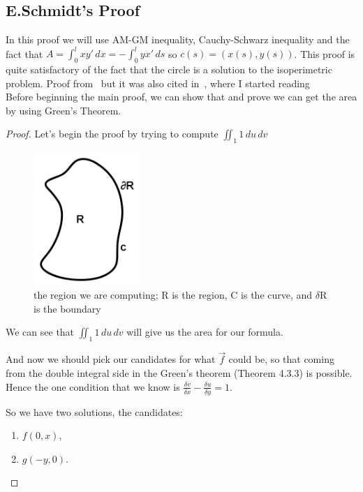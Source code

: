 \documentclass[a4paper]{book}
\numberwithin{theorem}{section}%
\begin{document}
\subsection{E.Schmidt's Proof}
In this proof we will use AM-GM inequality, Cauchy-Schwarz inequality and the fact that $\displaystyle A=\int_{0}^{l} xy' \,dx = -\int_{0}^{l} yx' \,ds$ so $\displaystyle c(s)=(x(s),y(s))$. This proof is quite satisfactory of the fact that the circle is a solution to the isoperimetric problem. Proof from~\citep{do2016differential} but it was also cited in~\citep{gluck2012isoperimetric}, where I started reading~\citep{do2016differential}
\leavevmode \\

Before beginning the main proof, we can show that and prove we can get the area by using Green's Theorem.
\newpage
\begin{proof}
	Let's begin the proof by trying to compute $\displaystyle \iint_{1} 1 \,du\,dv$
	\begin{figure}[hbt!]
        \begin{center}   
            \includegraphics[width=40mm]{Schmidt3}
            \caption{the region we are computing; R is the region, C is the curve, and $\delta\mathrm{R}$ is the boundary}
        \end{center}
    \end{figure}\leavevmode
    \newline
    We can see that $\displaystyle \iint_{1} 1 \,du\,dv$ will give us the area for our formula.

	And now we should pick our candidates for what $\overrightarrow{f}$ could be, so that coming from the double integral side in the Green's theorem (Theorem 4.3.3) is possible. Hence the one condition that we know is $\displaystyle \frac{\delta v}{\delta x}-\frac{\delta u}{\delta y}=1$.
	
	So we have two solutions, the candidates:
	\begin{enumerate}
		\item $f(0,x)$,
		\item $g(-y,0)$.
	\end{enumerate}
	

\end{proof}
\end{document}
